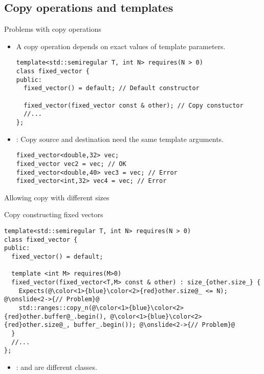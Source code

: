 \subsection{Copy operations and templates}

\begin{frame}[t,fragile]{Problems with copy operations}
\begin{itemize}
  \item A copy operation depends on exact values of template parameters.
\begin{lstlisting}
template<std::semiregular T, int N> requires(N > 0)
class fixed_vector {
public:
  fixed_vector() = default; // Default constructor

  fixed_vector(fixed_vector const & other); // Copy constuctor
  //...
};
\end{lstlisting}

  \item {}: Copy source and destination need 
        the same template arguments.
\begin{lstlisting}
fixed_vector<double,32> vec;
fixed_vector vec2 = vec; // OK
fixed_vector<double,40> vec3 = vec; // Error
fixed_vector<int,32> vec4 = vec; // Error
\end{lstlisting}

\end{itemize}
\end{frame}

\begin{frame}[t,fragile]{Allowing copy with different sizes}
\begin{block}{Copy constructing fixed vectors}
\begin{lstlisting}[escapechar=@]
template<std::semiregular T, int N> requires(N > 0)
class fixed_vector {
public:
  fixed_vector() = default;

  template <int M> requires(M>0)
  fixed_vector(fixed_vector<T,M> const & other) : size_{other.size_} {
    Expects(@\color<1>{blue}\color<2>{red}other.size@_ <= N); @\onslide<2->{// Problem}@
    std::ranges::copy_n(@\color<1>{blue}\color<2>{red}other.buffer@_.begin(), @\color<1>{blue}\color<2>{red}other.size@_, buffer_.begin()); @\onslide<2->{// Problem}@
  }
  //...
};
\end{lstlisting}
\end{block}
\begin{itemize}
  \item<2> :  and  are different classes.
\end{itemize}
\end{frame}

